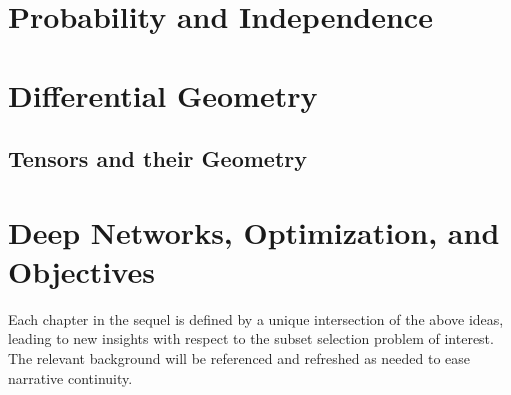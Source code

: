 \section{Probability and Independence}


\section{Differential Geometry}\label{sec:diffgeom}


\subsection{Tensors and their Geometry}


\section{Deep Networks, Optimization, and Objectives}


Each chapter in the sequel
is defined by a unique intersection
of the above ideas, leading to new insights
with respect to the subset selection problem of interest.
The relevant background will be referenced and refreshed 
as needed to ease narrative continuity.